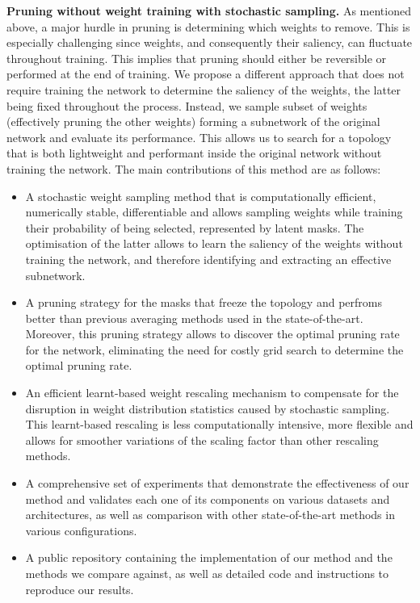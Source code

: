 \noindent \textbf{Pruning without weight training with stochastic sampling.} As
mentioned above, a major hurdle in pruning is determining which weights to
remove. This is especially challenging since weights, and consequently their
saliency, can fluctuate throughout training. This implies that pruning should
either be reversible or performed at the end of training. We propose a different
approach that does not require training the network to determine the saliency of
the weights, the latter being fixed throughout the process. Instead, we sample
subset of weights (effectively pruning the other weights) forming a subnetwork
of the original network and evaluate its performance. This allows us to search
for a topology that is both lightweight and performant inside the original
network without training the network. The main contributions of this method are
as follows: \\

\begin{itemize}
      \item A stochastic weight sampling method that is computationally
            efficient, numerically stable, differentiable and allows sampling
            weights while training their probability of being selected,
            represented by latent masks. The optimisation of the latter allows
            to learn the saliency of the weights without training the network,
            and therefore identifying and extracting an effective subnetwork.

      \item A pruning strategy for the masks that freeze the topology and
            perfroms better than previous averaging methods used in the
            state-of-the-art. Moreover, this pruning strategy allows to discover the
            optimal pruning rate for the network, eliminating the need for costly grid
            search to determine the optimal pruning rate.

      \item An efficient learnt-based weight rescaling mechanism to compensate
            for the disruption in weight distribution statistics caused by
            stochastic sampling. This learnt-based rescaling is less
            computationally intensive, more flexible and allows for smoother
            variations of the scaling factor than other rescaling methods.

      \item A comprehensive set of experiments that demonstrate the
            effectiveness of our method and validates each one of its components
            on various datasets and architectures, as well as comparison with
            other state-of-the-art methods in various configurations.

      \item A public repository containing the implementation of our method and
            the methods we compare against, as well as detailed code and instructions to
            reproduce our results.\\
\end{itemize}

